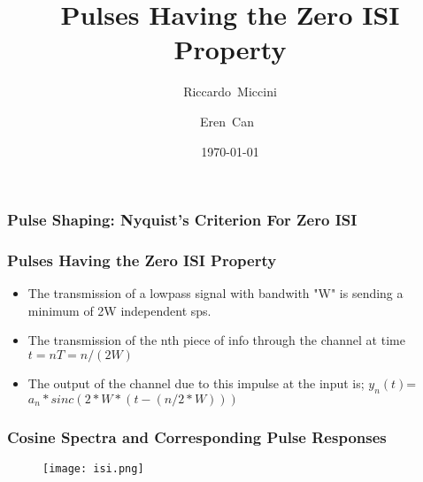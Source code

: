 \documentclass{beamer}
\title{Pulses Having the Zero ISI Property}
\subtitle{}
\author[Riccardo \and Eren]{Riccardo~Miccini\inst{1} \and Eren~Can~\inst{1}}
\institute[DTU]
{
	\inst{1}
	Technical University of Denmark\\
	Digital Communication
}
\date{\today}
\begin{document}
	\frame{\titlepage}
	\begin{frame}
		\frametitle{Pulse Shaping: Nyquist's Criterion For Zero ISI}
	\end{frame}
	\begin{frame}
		\frametitle{Pulses Having the Zero ISI Property}
		\begin{itemize}
			\item The transmission of a lowpass signal with bandwith "W" is sending a minimum of 2W independent sps.
			\item The transmission of the nth piece of info through the channel at time $t= nT=n/(2W)$
			\item The output of the channel due to this impulse at the input is; $y_n(t)$=$ a_n *sinc(2*W*(t-(n/2*W)))$
			\end{itemize}
			\end{frame}
			\begin{frame}
			\frametitle{Cosine Spectra and Corresponding Pulse Responses}
			\begin{figure}
			\texttt{[image: isi.png]}
			\end{figure}
			\end{frame}
	
\end{document}
